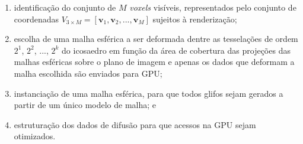 \begin{enumerate}
    \item identificação do conjunto de $M$ \textit{voxels} visíveis, representados pelo conjunto de coordenadas $V_{3 \times M} = [
\mathbf{v}_1,
\mathbf{v}_2, ..., 
\mathbf{v}_M
]$ sujeitos à renderização;
\item escolha de uma malha esférica a ser deformada dentre as tesselações de ordem $2^1$, $2^2$, ..., $2^k$ do icosaedro em função da área de cobertura das projeções das malhas esféricas sobre o plano de imagem e apenas os dados que deformam a malha escolhida são enviados para GPU;
\item instanciação de uma malha esférica, para que todos glifos sejam gerados a partir de um único modelo de malha; e
\item estruturação dos dados de difusão para que acessos na GPU sejam otimizados.
\end{enumerate}




